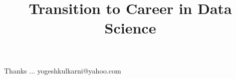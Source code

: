 \documentclass[xcolor=dvipsnames,compress,t,pdf,9pt]{beamer}
\title[\insertframenumber /\inserttotalframenumber]{Transition to Career in Data Science}
\begin{document}
	\begin{frame}
	\titlepage
%
	\end{frame}
	
	
	\begin{frame}[c]{}
	Thanks ...
	\vspace{5mm}
	yogeshkulkarni@yahoo.com
	\end{frame}
\end{document}

